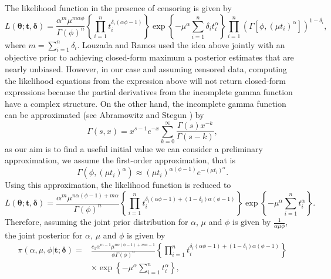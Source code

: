 \documentclass[]{interact}
\newcommand{\bs}{\boldsymbol}
\theoremstyle{plain}%
\theoremstyle{definition}
\theoremstyle{remark}
\begin{document}
The likelihood function in the presence of censoring is given by
\begin{equation*}L(\boldsymbol{\theta; t,\delta})
=\frac{\alpha^m\mu^{m\alpha\phi}}{\Gamma(\phi)^n}\left\{\prod_{i=1}^n{t_i^{\delta_i(\alpha\phi-1)}}\right\}\exp\left\{-\mu^{\alpha}\sum_{i=1}^n {\delta_i}t_i^{\alpha}\right\}\prod_{i=1}^n\left(\Gamma[\phi,(\mu t_i)^{\alpha}]\right)^{1-\delta_i},
\end{equation*}
where $m=\sum_{i=1}^{n}\delta_i$. Louzada and Ramos \cite{louzada2018efficient} used the idea above jointly with an objective prior to achieving closed-form maximum a posterior estimates that are nearly unbiased. However, in our case and assuming censored data, computing the likelihood equations from the expression above will not return closed-form expressions because the partial derivatives from the incomplete gamma function have a complex structure. On the other hand, the incomplete gamma function can be approximated (see Abramowitz and Stegun \cite{abramowitz}) by
\begin{equation*} \Gamma(s,x) = x^{s-1}e^{-x}\sum_{k=0}^{\infty} \frac{\Gamma(s)x^{-k}}{\Gamma(s-k)},
\end{equation*}
as our aim is to find a useful initial value we can consider a preliminary approximation, we assume the first-order approximation, that is
\begin{equation*}\Gamma(\phi,(\mu t_i)^\alpha) \approx (\mu t_i)^{\alpha(\phi-1)}e^{-(\mu t_i)^{\alpha}}.
\end{equation*}
Using this approximation, the likelihood function is reduced to
\begin{equation*}L(\bs{\theta;t,\delta})
=\frac{\alpha^m\mu^{n\alpha(\phi-1)+m\alpha}}{\Gamma(\phi)^n}\left\{\prod_{i=1}^n{t_i^{\delta_i(\alpha\phi-1)+(1-\delta_i)\alpha(\phi-1)}}\right\}\exp\left\{-\mu^{\alpha}\sum_{i=1}^n t_i^{\alpha}\right\}.
\end{equation*}
Therefore, assuming the joint prior distribution for $\alpha$, $\mu$ and $\phi$ is given by $\frac{1}{\alpha\mu\phi}$, the joint posterior for $\alpha$, $\mu$ and $\phi$ is given by
\begin{align*}%
\pi(\alpha,\mu,\phi|\bs{t;\delta})
=&\frac{c_1\alpha^{m-1}\mu^{n\alpha(\phi-1)+m\alpha-1}}{\phi\Gamma(\phi)^n}\left\{\prod_{i=1}^n{t_i^{\delta_i(\alpha\phi-1)+(1-\delta_i)\alpha(\phi-1)}}\right\}\nonumber \\
&\times \exp\left\{-\mu^{\alpha}\sum_{i=1}^n t_i^{\alpha}\right\},
\end{align*} %
\end{document}
